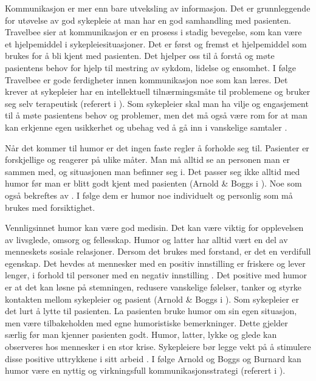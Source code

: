 Kommunikasjon er mer enn bare utveksling av informasjon. Det er grunnleggende
for utøvelse av god sykepleie at man har en god samhandling med pasienten.
Travelbee sier at kommunikasjon er en prosess i stadig bevegelse, som kan være
et hjelpemiddel i sykepleiesituasjoner. Det er først og fremst et hjelpemiddel
som brukes for å bli kjent med pasienten. Det hjelper oss til å forstå og møte
pasientens behov for hjelp til mestring av sykdom, lidelse og ensomhet. I følge
Travelbee er gode ferdigheter innen kommunikasjon noe som kan læres. Det krever
at sykepleier har en intellektuell tilnærmingsmåte til problemene og bruker seg
selv terapeutisk (referert i ). Som
sykepleier skal man ha vilje og engasjement til å møte pasientens behov og
problemer, men det må også være rom for at man kan erkjenne egen usikkerhet og
ubehag ved å gå inn i vanskelige samtaler
\cite[s.~81]{reitan2008.kommunikasjon}.

Når det kommer til humor er det ingen faste regler å forholde seg til.
Pasienter er forskjellige og reagerer på ulike måter. Man må alltid se an
personen man er sammen med, og situasjonen man befinner seg i. Det passer seg
ikke alltid med humor før man er blitt godt kjent med pasienten (Arnold \&{}
Boggs i ). Noe som også bekreftes av
. I følge dem er humor noe individuelt og personlig
som må brukes med forsiktighet.

Vennligsinnet humor kan være god medisin. Det kan være viktig for opplevelsen
av livsglede, omsorg og fellesskap. Humor og latter har alltid vært en del av
menneskets sosiale relasjoner. Dersom det brukes med forstand, er det en
verdifull egenskap. Det hevdes at mennesker med en positiv innstilling er
friskere og lever lenger, i forhold til personer med en negativ innstilling
\cite[s.~55]{bohn2000}. Det positive med humor er at det kan løsne på
stemningen, redusere vanskelige følelser, tanker og styrke kontakten mellom
sykepleier og pasient (Arnold \&{} Boggs i ). Som
sykepleier er det lurt å lytte til pasienten. La pasienten bruke humor om sin
egen situasjon, men være tilbakeholden med egne humoristiske bemerkninger.
Dette gjelder særlig før man kjenner pasienten godt. Humor, latter, lykke og
glede kan observeres hos mennesker i en stor krise. Sykepleiere bør legge vekt
på å stimulere disse positive uttrykkene i sitt arbeid \cite[s.~169]{wist2002}.
I følge Arnold og Boggs og Burnard kan humor være en nyttig og virkningsfull
kommunikasjonsstrategi (referert i ).

